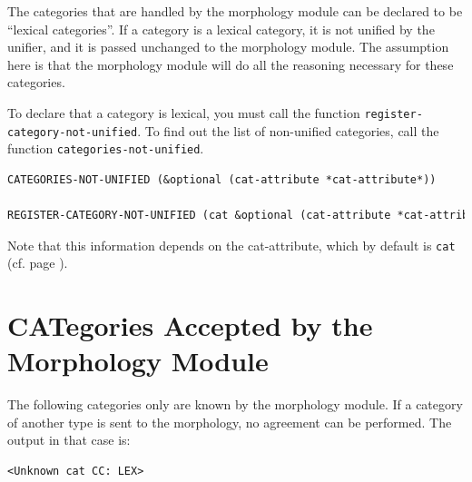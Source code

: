 \documentclass[10pt,a4paper]{report}
\begin{document}
The categories that are handled by the morphology module can be declared to
be ``lexical categories''. If a category is a lexical category, it is not
unified by the unifier, and it is passed unchanged to the morphology
module. The assumption here is that the morphology module will do all the
reasoning necessary for these categories.

To declare that a category is lexical, you must call the function
{\tt register-category-not-unified}.  To find out the list of non-unified
categories, call the function {\tt categories-not-unified}.

\begin{lstlisting}[language=Lisp]
CATEGORIES-NOT-UNIFIED (&optional (cat-attribute *cat-attribute*))

REGISTER-CATEGORY-NOT-UNIFIED (cat &optional (cat-attribute *cat-attribute*))
\end{lstlisting}

Note that this information depends on the cat-attribute, which by default
is {\tt cat} (cf. page \pageref{cat-attribute}).


\section{CATegories Accepted by the Morphology Module}

The following categories only are known by the morphology module.  If a
category of another type is sent to the morphology, no agreement can be
performed.  The output in that  case is:

\begin{lstlisting}[language=Lisp]
<Unknown cat CC: LEX>
\end{lstlisting}


\end{document}
